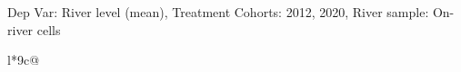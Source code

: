 \begin{table}[H]
\captionlistentry[table]{}
\label{table:beaver_hydrometry_DVlevel_mean_SCg13}
\tiny %
Dep Var: River level (mean), Treatment Cohorts: 2012, 2020, River sample: On-river cells \\
\begin{threeparttable}
\begin{tabulary}{\textwidth}{l*{9}{c}@{}}
\toprule \toprule
\noalign{\smallskip}
\noalign{\smallskip}
\midrule \bottomrule
\end{tabulary}
\medskip
\end{threeparttable}
\end{table}
